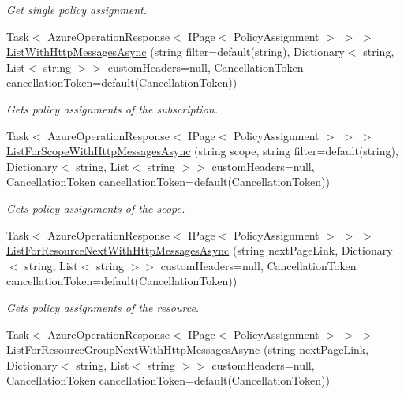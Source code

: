 \begin{DoxyCompactItemize}
\begin{DoxyCompactList}\small\item\em Get single policy assignment. \end{DoxyCompactList}\item 
Task$<$ Azure\+Operation\+Response$<$ I\+Page$<$ Policy\+Assignment $>$ $>$ $>$ \hyperlink{interface_microsoft_1_1_azure_1_1_management_1_1_resources_1_1_i_policy_assignments_operations_a099cbe7fdd43cc73098f762144fbfdf6}{List\+With\+Http\+Messages\+Async} (string filter=default(string), Dictionary$<$ string, List$<$ string $>$$>$ custom\+Headers=null, Cancellation\+Token cancellation\+Token=default(Cancellation\+Token))
\begin{DoxyCompactList}\small\item\em Gets policy assignments of the subscription. \end{DoxyCompactList}\item 
Task$<$ Azure\+Operation\+Response$<$ I\+Page$<$ Policy\+Assignment $>$ $>$ $>$ \hyperlink{interface_microsoft_1_1_azure_1_1_management_1_1_resources_1_1_i_policy_assignments_operations_afd5e242e309239a71bbff92461f9f11c}{List\+For\+Scope\+With\+Http\+Messages\+Async} (string scope, string filter=default(string), Dictionary$<$ string, List$<$ string $>$$>$ custom\+Headers=null, Cancellation\+Token cancellation\+Token=default(Cancellation\+Token))
\begin{DoxyCompactList}\small\item\em Gets policy assignments of the scope. \end{DoxyCompactList}\item 
Task$<$ Azure\+Operation\+Response$<$ I\+Page$<$ Policy\+Assignment $>$ $>$ $>$ \hyperlink{interface_microsoft_1_1_azure_1_1_management_1_1_resources_1_1_i_policy_assignments_operations_a17adb89baff82e98ed5f18d2bfa43680}{List\+For\+Resource\+Next\+With\+Http\+Messages\+Async} (string next\+Page\+Link, Dictionary$<$ string, List$<$ string $>$$>$ custom\+Headers=null, Cancellation\+Token cancellation\+Token=default(Cancellation\+Token))
\begin{DoxyCompactList}\small\item\em Gets policy assignments of the resource. \end{DoxyCompactList}\item 
Task$<$ Azure\+Operation\+Response$<$ I\+Page$<$ Policy\+Assignment $>$ $>$ $>$ \hyperlink{interface_microsoft_1_1_azure_1_1_management_1_1_resources_1_1_i_policy_assignments_operations_a4569d6a4f9d7fc4249db1ab95ee8dd05}{List\+For\+Resource\+Group\+Next\+With\+Http\+Messages\+Async} (string next\+Page\+Link, Dictionary$<$ string, List$<$ string $>$$>$ custom\+Headers=null, Cancellation\+Token cancellation\+Token=default(Cancellation\+Token))

\end{DoxyCompactItemize}
